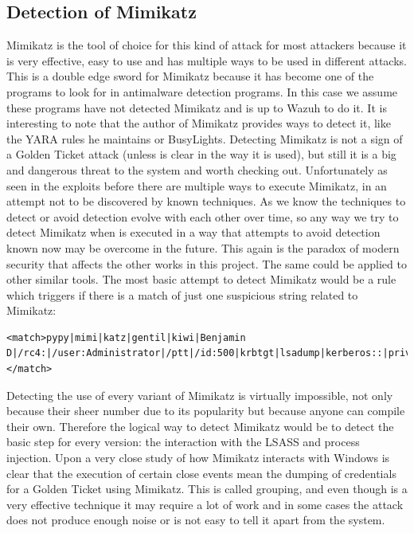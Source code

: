 \subsection{Detection of Mimikatz}
Mimikatz is the tool of choice for this kind of attack for most attackers because it is very effective, easy to use and has multiple ways to be used in different attacks\cite{mimikatz_github}\cite{mimikatz_details}. This is a double edge sword for Mimikatz because it has become one of the programs to look for in antimalware detection programs. In this case we assume these programs have not detected Mimikatz and is up to Wazuh to do it. It is interesting to note that the author of Mimikatz provides ways to detect it, like the YARA rules he maintains\cite{mimikatz_yara_rules} or BusyLights\cite{understanding_powersploit_mimikatz}.
\linej
\linej
Detecting Mimikatz is not a sign of a Golden Ticket attack (unless is clear in the way it is used), but still it is a big and dangerous threat to the system and worth checking out.
\linej
Unfortunately as seen in the exploits before there are multiple ways to execute Mimikatz, in an attempt not to be discovered by known techniques. As we know the techniques to detect or avoid detection evolve with each other over time, so any way we try to detect Mimikatz when is executed in a way that attempts to avoid detection known now may be overcome in the future. This again is the paradox of modern security that affects the other works in this project. The same could be applied to other similar tools.
\linej
\linej
The most basic attempt to detect Mimikatz would be a rule which triggers if there is a match of just one suspicious string related to Mimikatz:
\begin{lstlisting}[style=xml,numbers=none]
<match>pypy|mimi|katz|gentil|kiwi|Benjamin D|/rc4:|/user:Administrator|/ptt|/id:500|krbtgt|lsadump|kerberos::|privilege::</match>
\end{lstlisting}
\linej
Detecting the use of every variant of Mimikatz is virtually impossible, not only because their sheer number due to its popularity but because anyone can compile their own. Therefore the logical way to detect Mimikatz would be to detect the basic step for every version: the interaction with the LSASS and process injection\cite{understanding_powersploit_mimikatz}.
\linej
\linej
Upon a very close study of how Mimikatz interacts with Windows is clear that the execution of certain close events mean the dumping of credentials for a Golden Ticket using Mimikatz. This is called grouping, and even though is a very effective technique it may require a lot of work and in some cases the attack does not produce enough noise or is not easy to tell it apart from the system.
